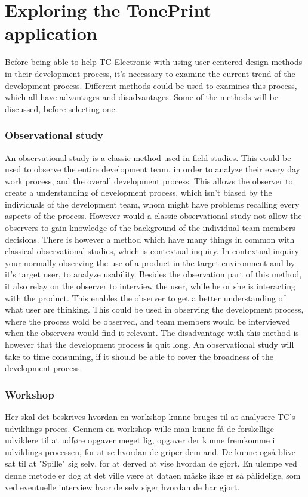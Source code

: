 \chapter{Exploring the TonePrint application}
\label{HeursiticEvaluation}
Before being able to help TC Electronic with using user centered design methods in their development process, it's necessary to examine the current trend of the development process. Different methods could be used to examines this process, which all have advantages and disadvantages. Some of the methods will be discussed, before selecting one.

\subsection*{Observational study}
\label{MethodObservation}
An observational study is a classic method used in field studies. This could be used to observe the entire development team, in order to analyze their every day work process, and the overall development process. This allows the observer to create a understanding of development process, which isn't biased by the individuals of the development team, whom might have problems recalling every aspects of the process. However would a classic observational study not allow the observers to gain knowledge of the background of the individual team members decisions. There is however a method which have many things in common with classical observational studies, which is contextual inquiry. In contextual inquiry your normally observing the use of a product in the target environment and by it's target user, to analyze usability. Besides the observation part of this method, it also relay on the observer to interview the user, while he or she is interacting with the product. This enables the observer to get a better understanding of what user are thinking. This could be used in observing the development process, where the process wold be observed, and team members would be interviewed when the observers would find it relevant. The disadvantage with this method is however that the development process is quit long. An observational study will take to time consuming, if it should be able to cover the broadness of the development process.

\subsection*{Workshop}
\label{MethodWorkshop}
Her skal det beskrives hvordan en workshop kunne bruges til at analysere TC's udviklings proces. Gennem en workshop wille man kunne få de forskellige udviklere til at udføre opgaver meget lig, opgaver der kunne fremkomme i udviklings processen, for at se hvordan de griper dem and. De kunne også blive sat til at "Spille" sig selv, for at derved at vise hvordan de gjort. En ulempe ved denne metode er dog at det ville være at dataen måske ikke er så pålidelige, som ved eventuelle interview hvor de selv siger hvordan de har gjort.

